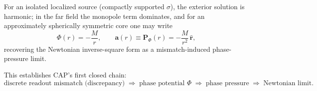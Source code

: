 For an isolated localized source (compactly supported $\sigma$), the exterior solution is harmonic; in the far field the monopole term dominates, and for an approximately spherically symmetric core one may write
\begin{equation}
  \Phi(r) = -\frac{M}{r},
  \qquad
  \mathbf{a}(r) \equiv \mathbf{P}_{\Phi}(r) = -\frac{M}{r^{2}}\, \hat{\mathbf{r}} ,
\end{equation}
recovering the Newtonian inverse-square form as a mismatch-induced phase-pressure limit.

\noindent This establishes CAP's first closed chain:
\begin{equation}
  \text{discrete readout mismatch (discrepancy)}
  \;\Rightarrow\;
  \text{phase potential } \Phi
  \;\Rightarrow\;
  \text{phase pressure}
  \;\Rightarrow\;
  \text{Newtonian limit}.
\end{equation}


